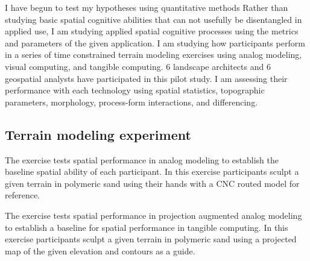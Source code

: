 \documentclass{sigchi}
\begin{document}
I have begun to test my hypotheses 
using quantitative methods %
Rather than studying basic spatial cognitive abilities that can not 
usefully be disentangled in applied use,
I am studying applied spatial cognitive processes 
using the metrics and parameters of the given application.
I am studying how participants perform 
in a series of time constrained terrain modeling 
exercises using analog modeling, visual computing, and tangible computing.
6 landscape architects and 6 geospatial analysts 
have participated in this pilot study. 
I am assessing their performance with each technology using 
spatial statistics, topographic parameters, morphology, 
process-form interactions, and differencing. 

\subsection{Terrain modeling experiment}

The  exercise tests spatial performance in analog modeling 
to establish the baseline spatial ability of each participant.
In this exercise participants 
sculpt a given terrain in polymeric sand using their hands
with a CNC routed model for reference.

The  exercise tests spatial performance 
in projection augmented analog modeling 
to establish a baseline for spatial performance in tangible computing.
In this exercise participants 
sculpt a given terrain in polymeric sand 
using a projected map of the given elevation 
and contours as a guide.
\end{document}
